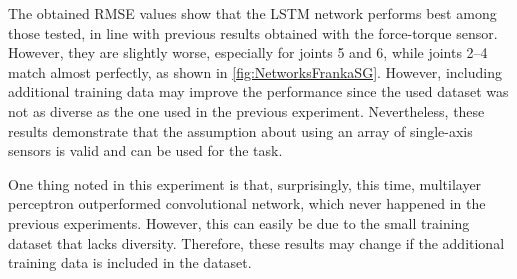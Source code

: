 The obtained RMSE values show that the LSTM network performs best among those tested, in line with previous results obtained with the force-torque sensor. However, they are slightly worse, especially for joints 5 and 6, while joints 2--4 match almost perfectly, as shown in \ref{fig:NetworksFrankaSG}. However, including additional training data may improve the performance since the used dataset was not as diverse as the one used in the previous experiment. Nevertheless, these results demonstrate that the assumption about using an array of single-axis sensors is valid and can be used for the task. 

One thing noted in this experiment is that, surprisingly, this time, multilayer perceptron outperformed convolutional network, which never happened in the previous experiments. However, this can easily be due to the small training dataset that lacks diversity. Therefore, these results may change if the additional training data is included in the dataset.

